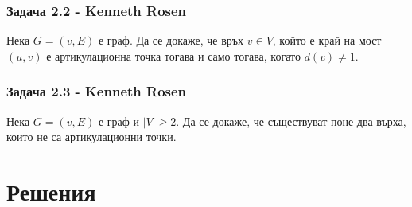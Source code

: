 \documentclass[12pt]{article}
\begin{document}
\subsubsection*{Задача 2.2 - Kenneth Rosen}
Нека $G = (v, E)$ е граф. Да се докаже, че връх $v \in V$, който е край на мост $(u, v)$ е артикулационна точка тогава и само тогава, когато $d(v) \neq 1$. 
\subsubsection*{Задача 2.3 - Kenneth Rosen}
Нека $G = (v, E)$ е граф и $|V| \geq 2$. Да се докаже, че съществуват поне два върха, които не са артикулационни точки. 


\section*{Решения}
\end{document}
